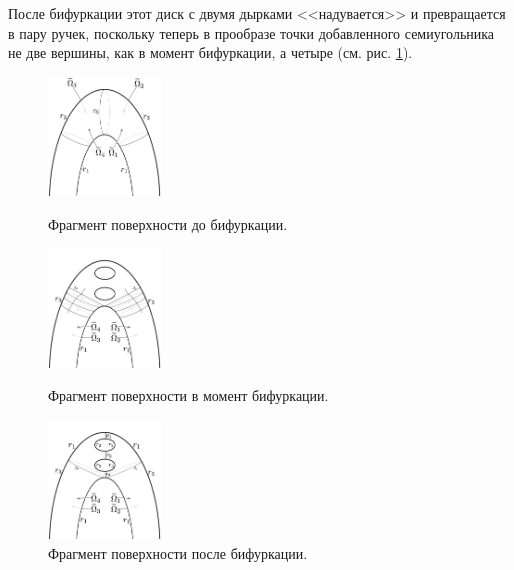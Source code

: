 После бифуркации этот диск с двумя дырками <<надувается>> и превращается в пару ручек, поскольку теперь в прообразе точки добавленного семиугольника не две вершины, как в момент бифуркации, а четыре (см. рис. \ref{fig:pt10:_II_after_surface_segment}).
\begin{figure}[!htb]
\centering
\includegraphics[width=3cm]{images/ch4/section3_circular/atoms/II/before/before_surface_segment.pdf}
    \caption{Фрагмент поверхности до бифуркации.}
        \label{fig:pt10:_II_before_surface}
\endminipage\hfill
{}
\centering
\includegraphics[width=3cm]{images/ch4/section3_circular/atoms/II/bifurcation/surface_segment.pdf}
    \caption{Фрагмент поверхности в момент бифуркации.}
        \label{fig:pt10:_II_surface_segment}
\endminipage\hfill
{}
\centering
\includegraphics[width=3cm]{images/ch4/section3_circular/atoms/II/after/surface_segment.pdf}
    \caption{Фрагмент поверхности после бифуркации.}
        \label{fig:pt10:_II_after_surface_segment}
\endminipage\hfill
\end{figure}

